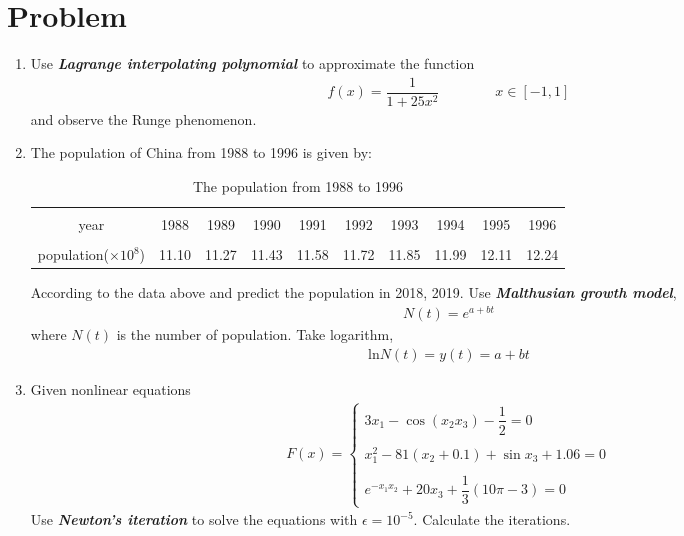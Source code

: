 \documentclass[a4paper,11pt]{article}
\begin{document}
\section{Problem}
\begin{enumerate}
    \item Use \textit{\textbf{Lagrange interpolating polynomial}} to approximate the function 
    \begin{eqnarray}
        f(x)=\dfrac{1}{1+25x^2}\quad\quad\quad\quad x\in[-1,1]
    \end{eqnarray}
    and observe the Runge phenomenon.
    \item The population of China from 1988 to 1996 is given by:
    \begin{table}[h]
        \centering
        \begin{tabular}{c|c|c|c|c|c|c|c|c|c}
            \hline
            & & & & & & & & &\\[-6pt]
            year&1988&1989&1990&1991&1992&1993&1994&1995&1996\\
            \hline
            & & & & & & & & &\\[-6pt]
            population($\times 10^{8}$)&11.10&11.27&11.43&11.58&11.72&11.85&11.99&12.11&12.24\\
            \hline
        \end{tabular}
        \caption{The population from 1988 to 1996}
    \end{table}
    
    According to the data above and predict the population in 2018, 2019. Use \textit{\textbf{Malthusian growth model}}, 
    \begin{eqnarray}
        N(t)=e^{a+bt}
    \end{eqnarray}
    where $N(t)$ is the number of population. Take logarithm,
    \begin{eqnarray}
        \textrm{ln}N(t)=y(t)=a+bt
    \end{eqnarray}
    
    \item Given nonlinear equations
    \begin{eqnarray}
        F(x)=\begin{cases}
            3x_1-\cos(x_2x_3)-\dfrac{1}{2}=0\\
            ~\\
            x_1^2-81(x_2+0.1)+\sin x_3+1.06=0\\
            ~\\
            e^{-x_1x_2}+20x_3+\dfrac{1}{3}(10\pi-3)=0
        \end{cases}
    \end{eqnarray}
    Use \textit{\textbf{Newton's iteration}} to solve the equations with $\epsilon=10^{-5}$. Calculate the iterations.
\end{enumerate}
\end{document}
